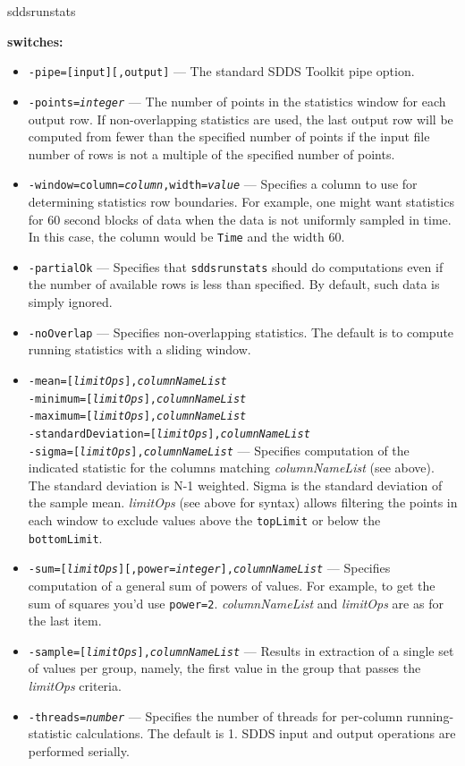 \begin{sddsprog}{sddsrunstats}
  \item \textbf{switches:}
    \begin{itemize}
    \item {\tt -pipe=[input][,output]} --- The standard SDDS Toolkit pipe option.
    \item {\tt -points=\emph{integer}} --- The number of points in the statistics window for each output row. If non-overlapping statistics are used, the last output row will be computed from fewer than the specified number of points if the input file number of rows is not a multiple of the specified number of points.
    \item {\tt -window=column=\emph{column},width=\emph{value}} --- Specifies a column to use for determining statistics row boundaries. For example, one might want statistics for 60 second blocks of data when the data is not uniformly sampled in time. In this case, the column would be \verb|Time| and the width 60.
    \item {\tt -partialOk} --- Specifies that \verb|sddsrunstats| should do computations even if the number of available rows is less than specified. By default, such data is simply ignored.
    \item {\tt -noOverlap} --- Specifies non-overlapping statistics. The default is to compute running statistics with a sliding window.
    \item {\tt -mean=[\emph{limitOps}],\emph{columnNameList}}\\
      {\tt -minimum=[\emph{limitOps}],\emph{columnNameList}}\\
      {\tt -maximum=[\emph{limitOps}],\emph{columnNameList}}\\
      {\tt -standardDeviation=[\emph{limitOps}],\emph{columnNameList}}\\
      {\tt -sigma=[\emph{limitOps}],\emph{columnNameList}} --- Specifies computation of the indicated statistic for the columns matching \emph{columnNameList} (see above). The standard deviation is N-1 weighted. Sigma is the standard deviation of the sample mean. \emph{limitOps} (see above for syntax) allows filtering the points in each window to exclude values above the \verb|topLimit| or below the \verb|bottomLimit|.
    \item {\tt -sum=[\emph{limitOps}][,power=\emph{integer}],\emph{columnNameList}} --- Specifies computation of a general sum of powers of values. For example, to get the sum of squares you'd use \verb|power=2|. \emph{columnNameList} and \emph{limitOps} are as for the last item.
    \item {\tt -sample=[\emph{limitOps}],\emph{columnNameList}} --- Results in extraction of a single set of values per group, namely, the first value in the group that passes the \emph{limitOps} criteria.
    \item {\tt -threads=\emph{number}} --- Specifies the number of threads for per-column running-statistic calculations. The default is 1. SDDS input and output operations are performed serially.
    \end{itemize}


\end{sddsprog}
